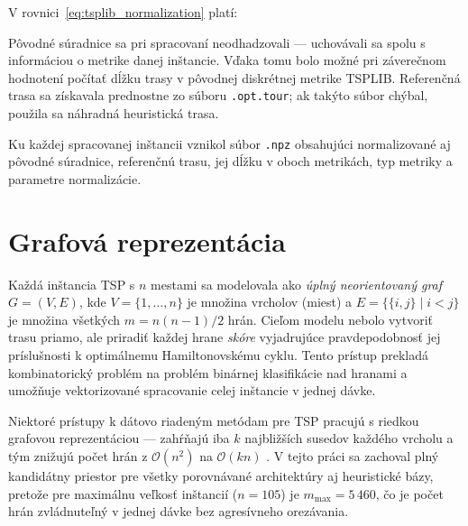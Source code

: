 \indent V rovnici~\eqref{eq:tsplib_normalization} platí:
\begin{symboltable}
\end{symboltable}

\indent Pôvodné súradnice sa pri spracovaní neodhadzovali — uchovávali
sa spolu s informáciou o metrike danej inštancie. Vďaka tomu bolo
možné pri záverečnom hodnotení počítať dĺžku trasy v pôvodnej
diskrétnej metrike TSPLIB. Referenčná trasa sa získavala prednostne
zo súboru \texttt{.opt.tour}; ak takýto súbor chýbal, použila sa
náhradná heuristická trasa.

\indent Ku každej spracovanej inštancii vznikol súbor \texttt{.npz}
obsahujúci normalizované aj pôvodné súradnice, referenčnú trasu, jej
dĺžku v oboch metrikách, typ metriky a parametre normalizácie.

\section{Grafová reprezentácia}
\label{sec:grafova_reprezentacia}

\indent Každá inštancia TSP s \(n\) mestami sa modelovala ako \emph{úplný
neorientovaný graf} \(G = (V, E)\), kde \(V = \{1, \ldots, n\}\) je množina
vrcholov (miest) a \(E = \{\{i,j\} \mid i < j\}\) je množina všetkých
\(m = n(n-1)/2\) hrán. Cieľom modelu nebolo vytvoriť trasu priamo, ale
priradiť každej hrane \emph{skóre} vyjadrujúce pravdepodobnosť jej
príslušnosti k optimálnemu Hamiltonovskému cyklu. Tento prístup prekladá
kombinatorický problém na problém binárnej klasifikácie nad hranami
a umožňuje vektorizované spracovanie celej inštancie v jednej dávke.

\indent Niektoré prístupy k dátovo riadeným metódam pre TSP pracujú
s riedkou grafovou reprezentáciou — zahŕňajú iba \(k\) najbližších susedov
každého vrcholu a tým znižujú počet hrán z \(\mathcal{O}(n^2)\) na
\(\mathcal{O}(kn)\) \parencite{joshi2022generalization}. V tejto
práci sa zachoval plný kandidátny priestor pre všetky porovnávané
architektúry aj heuristické bázy, pretože pre maximálnu veľkosť
inštancií (\(n = 105\)) je \(m_{\max} = 5\,460\), čo je počet hrán
zvládnuteľný v jednej dávke bez agresívneho orezávania.

